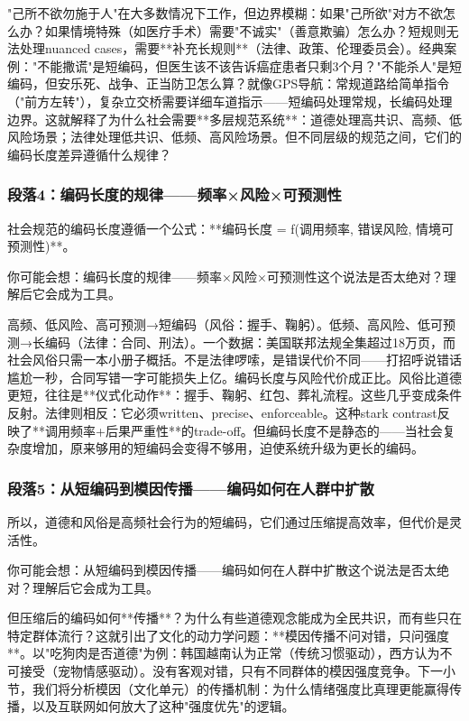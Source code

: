 \documentclass[openany, a4paper, 12pt]{book}
\newenvironment{motivation}{
	\vspace{0.5em}
	\begin{tcolorbox}[
		colback=gray!10,           %
		colframe=gray!60,          %
		title=\textit{本章动机 (Motivation)},
		fonttitle=\bfseries,
		arc=0mm,                   %
		leftrule=3mm               %
		]
		\small \itshape %
	}{
	\end{tcolorbox}
	\vspace{1em}
}
\begin{document}
\begin{motivation}
\begin{motivation}
\begin{motivation}
"己所不欲勿施于人"在大多数情况下工作，但边界模糊：如果"己所欲"对方不欲怎么办？如果情境特殊（如医疗手术）需要"不诚实"（善意欺骗）怎么办？短规则无法处理nuanced cases，需要**补充长规则**（法律、政策、伦理委员会）。经典案例："不能撒谎"是短编码，但医生该不该告诉癌症患者只剩3个月？"不能杀人"是短编码，但安乐死、战争、正当防卫怎么算？就像GPS导航：常规道路给简单指令（"前方左转"），复杂立交桥需要详细车道指示——短编码处理常规，长编码处理边界。这就解释了为什么社会需要**多层规范系统**：道德处理高共识、高频、低风险场景；法律处理低共识、低频、高风险场景。但不同层级的规范之间，它们的编码长度差异遵循什么规律？

	\subsubsection*{段落4：编码长度的规律——频率×风险×可预测性}
	社会规范的编码长度遵循一个公式：**编码长度 = f(调用频率, 错误风险, 情境可预测性)**。
	\begin{tcolorbox}[colback=yellow!5, title=\textit{读者行为预测}]
		你可能会想：编码长度的规律——频率×风险×可预测性这个说法是否太绝对？理解后它会成为工具。
	\end{tcolorbox}

高频、低风险、高可预测→短编码（风俗：握手、鞠躬）。低频、高风险、低可预测→长编码（法律：合同、刑法）。一个数据：美国联邦法规全集超过18万页，而社会风俗只需一本小册子概括。不是法律啰嗦，是错误代价不同——打招呼说错话尴尬一秒，合同写错一字可能损失上亿。编码长度与风险代价成正比。风俗比道德更短，往往是**仪式化动作**：握手、鞠躬、红包、葬礼流程。这些几乎变成条件反射。法律则相反：它必须written、precise、enforceable。这种stark contrast反映了**调用频率+后果严重性**的trade-off。但编码长度不是静态的——当社会复杂度增加，原来够用的短编码会变得不够用，迫使系统升级为更长的编码。

	\subsubsection*{段落5：从短编码到模因传播——编码如何在人群中扩散}
	所以，道德和风俗是高频社会行为的短编码，它们通过压缩提高效率，但代价是灵活性。
	\begin{tcolorbox}[colback=yellow!5, title=\textit{读者行为预测}]
		你可能会想：从短编码到模因传播——编码如何在人群中扩散这个说法是否太绝对？理解后它会成为工具。
	\end{tcolorbox}

但压缩后的编码如何**传播**？为什么有些道德观念能成为全民共识，而有些只在特定群体流行？这就引出了文化的动力学问题：**模因传播不问对错，只问强度**。以"吃狗肉是否道德"为例：韩国越南认为正常（传统习惯驱动），西方认为不可接受（宠物情感驱动）。没有客观对错，只有不同群体的模因强度竞争。下一小节，我们将分析模因（文化单元）的传播机制：为什么情绪强度比真理更能赢得传播，以及互联网如何放大了这种"强度优先"的逻辑。


\end{motivation}
\end{motivation}
\end{motivation}
\end{document}
